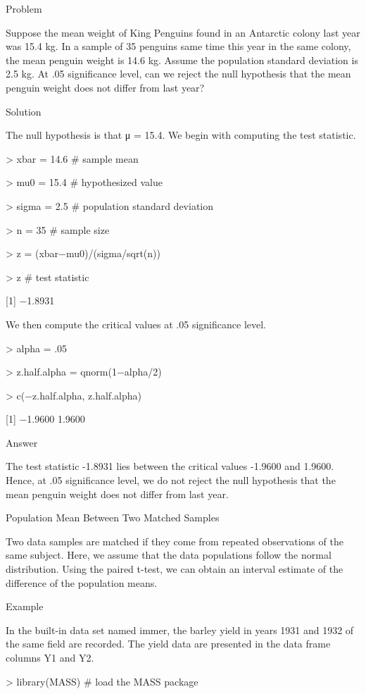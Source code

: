 Problem

Suppose the mean weight of King Penguins found in an Antarctic colony last year was 15.4 kg. In a sample of 35 penguins same time this year in the same colony, the mean penguin weight is 14.6 kg. Assume the population standard deviation is 2.5 kg. At .05 significance level, can we reject the null hypothesis that the mean penguin weight does not differ from last year?

Solution

The null hypothesis is that μ = 15.4. We begin with computing the test statistic.

> xbar = 14.6            # sample mean 

> mu0 = 15.4             # hypothesized value 

> sigma = 2.5            # population standard deviation 

> n = 35                 # sample size 

> z = (xbar−mu0)/(sigma/sqrt(n)) 

> z                      # test statistic 

[1] −1.8931

We then compute the critical values at .05 significance level.

> alpha = .05 

> z.half.alpha = qnorm(1−alpha/2) 

> c(−z.half.alpha, z.half.alpha) 

[1] −1.9600  1.9600

Answer

The test statistic -1.8931 lies between the critical values -1.9600 and 1.9600. Hence, at .05 significance level, we do not reject the null hypothesis that the mean penguin weight does not differ from last year.


Population Mean Between Two Matched Samples

Two data samples are matched if they come from repeated observations of the same subject. Here, we assume that the data populations follow the normal distribution. Using the paired t-test, we can obtain an interval estimate of the difference of the population means.


Example

In the built-in data set named immer, the barley yield in years 1931 and 1932 of the same field are recorded. The yield data are presented in the data frame columns Y1 and Y2.

> library(MASS)         # load the MASS package 

